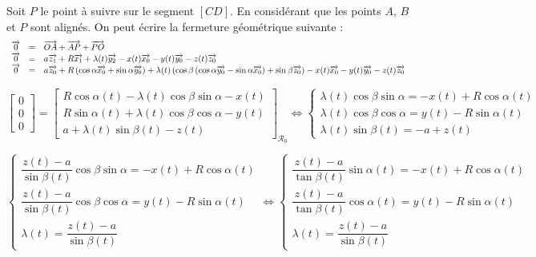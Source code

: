 \documentclass[10pt,fleqn]{article} %
\begin{document}
Soit $P$ le point à suivre sur le segment $[CD]$. En considérant que les points $A$, $B$ et $P$ sont alignés. On peut écrire la fermeture géométrique suivante :
$$ 
\begin{array}{lcl}
\overrightarrow{0} &=& \overrightarrow{OA} + \overrightarrow{AP} + \overrightarrow{PO}\\
\overrightarrow{0} &=& a \overrightarrow{z_{1}} + R \overrightarrow{x_{1}} + \lambda (t)\overrightarrow{y_{2}} - x(t) \overrightarrow{x_{0}} - y(t) \overrightarrow{y_{0}}- z(t) \overrightarrow{z_{0}} \\
\overrightarrow{0} &=& a \overrightarrow{z_{0}} + R \left( \cos\alpha \overrightarrow{x_{0}} + \sin \alpha \overrightarrow{y_{0}}\right) + \lambda (t)\left( \cos \beta\left( \cos\alpha \overrightarrow{y_{0}} - \sin \alpha \overrightarrow{x_{0}} \right) + \sin \beta \overrightarrow{z_{0}} \right) - x(t) \overrightarrow{x_{0}} - y(t) \overrightarrow{y_{0}} - z(t) \overrightarrow{z_{0}}\\
\end{array}
$$

$$
\left[
\begin{array}{c}
0 \\
0 \\
0 
\end{array}
\right]
 = \left[
\begin{array}{c}
R  \cos\alpha(t) - \lambda(t) \cos \beta \sin\alpha- x(t)\\ 
R  \sin \alpha(t) + \lambda(t) \cos \beta \cos\alpha  - y(t)\\
a + \lambda (t)\sin \beta (t)- z(t)
\end{array}
\right]_{\mathcal{R}_0}
\Leftrightarrow 
\left\{
\begin{array}{l}
\lambda(t) \cos \beta \sin\alpha =  -x(t) + R  \cos\alpha(t)\\ 
\lambda(t) \cos \beta \cos\alpha =  y(t) - R  \sin \alpha(t) \\
\lambda (t)\sin \beta (t)  = -a +  z(t) 
\end{array}
\right.
$$

$$
\left\{
\begin{array}{l}
\dfrac{z(t)-a }{\sin \beta (t)} \cos \beta \sin\alpha =  -x(t) + R  \cos\alpha(t)\\ 
\dfrac{z(t)-a }{\sin \beta (t)} \cos \beta \cos\alpha =  y(t) - R  \sin \alpha(t) \\
\lambda (t)  = \dfrac{z(t)-a }{\sin \beta (t)}
\end{array}
\right.
\Leftrightarrow
\left\{
\begin{array}{l}
\dfrac{z(t)-a }{\tan \beta (t)}  \sin\alpha(t) =  -x(t) + R  \cos\alpha(t)\\ 
\dfrac{z(t)-a }{\tan \beta (t)}  \cos\alpha(t) =  y(t) - R  \sin \alpha(t) \\
\lambda (t)  = \dfrac{z(t)-a }{\sin \beta (t)}
\end{array}
\right.
$$
\end{document}
